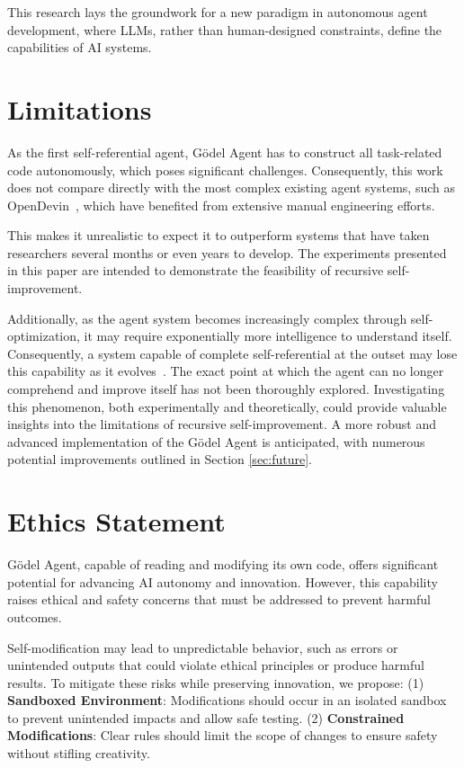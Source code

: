 \documentclass[11pt]{article}
\newcommand{\framework}{Gödel Agent\xspace}
\begin{document}
This research lays the groundwork for a new paradigm in autonomous agent development, where LLMs, rather than human-designed constraints, define the capabilities of AI systems. 



\section*{Limitations}

As the first self-referential agent, \framework has to construct all task-related code autonomously, which poses significant challenges. Consequently, this work does not compare directly with the most complex existing agent systems, such as OpenDevin~\citep{wang2024opendevinopenplatformai}, which have benefited from extensive manual engineering efforts. 

This makes it unrealistic to expect it to outperform systems that have taken researchers several months or even years to develop. The experiments presented in this paper are intended to demonstrate the feasibility of recursive self-improvement. 



Additionally, as the agent system becomes increasingly complex through self-optimization, it may require exponentially more intelligence to understand itself. 
Consequently, a system capable of complete self-referential at the outset may lose this capability as it evolves~\citep{Yampolskiylimitation}. The exact point at which the agent can no longer comprehend and improve itself has not been thoroughly explored. Investigating this phenomenon, both experimentally and theoretically, could provide valuable insights into the limitations of recursive self-improvement.
A more robust and advanced implementation of the \framework is anticipated, with numerous potential improvements outlined in Section \ref{sec:future}. 


\section*{Ethics Statement}
\framework{}, capable of reading and modifying its own code, offers significant potential for advancing AI autonomy and innovation. However, this capability raises ethical and safety concerns that must be addressed to prevent harmful outcomes.

Self-modification may lead to unpredictable behavior, such as errors or unintended outputs that could violate ethical principles or produce harmful results. To mitigate these risks while preserving innovation, we propose:
(1) \textbf{Sandboxed Environment}: Modifications should occur in an isolated sandbox to prevent unintended impacts and allow safe testing.
(2) \textbf{Constrained Modifications}: Clear rules should limit the scope of changes to ensure safety without stifling creativity.
\end{document}
